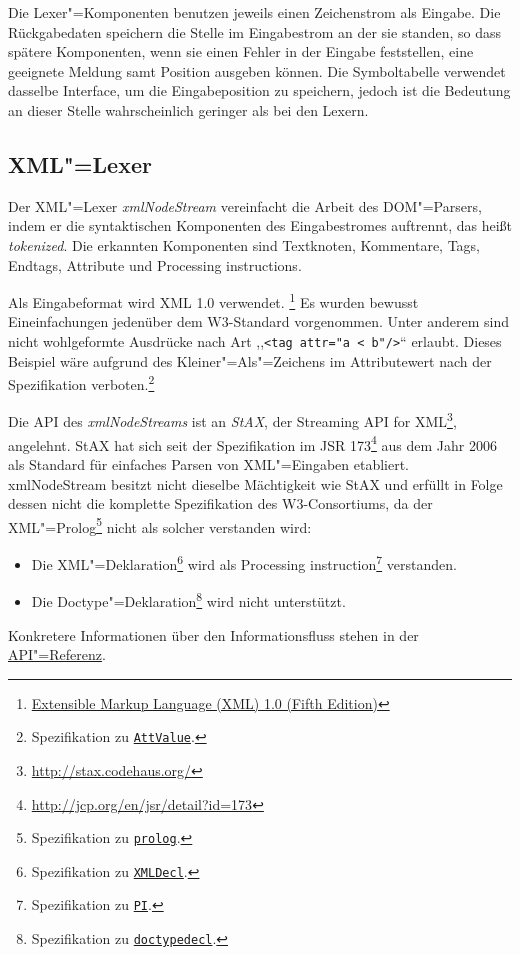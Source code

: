 \documentclass[10pt,a4paper,ngerman,titlepage,tocindentauto]{scrartcl}
\newcommand{\xmlNote}[2]{\footnote{Spezifikation zu \href{http://www.w3.org/TR/2008/REC-xml-20081126/\#{#1}}{\texttt{#2}}.}}
\newcommand{\link}[1]{\href{#1}{#1}}
\newcommand{\fnlink}[1]{\footnote{\link{#1}}}
\begin{document}
		Die Lexer"=Komponenten benutzen jeweils einen Zeichenstrom als Eingabe. Die Rückgabedaten speichern die
		Stelle im Eingabestrom an der sie standen, so dass spätere Komponenten, wenn sie einen Fehler
		in der Eingabe feststellen, eine geeignete Meldung samt Position ausgeben können.
		Die Symboltabelle verwendet dasselbe Interface, um die Eingabeposition zu speichern, jedoch ist
		die Bedeutung an dieser Stelle wahrscheinlich geringer als bei den Lexern.
		
		\subsection[XML"=Lexer]{\hypertarget{Teilprojekte_XML_Lexer}{XML"=Lexer}}
			Der XML"=Lexer {\em xmlNodeStream} vereinfacht die Arbeit des DOM"=Parsers, indem er die syntaktischen
			Komponenten des Eingabestromes auftrennt, das heißt {\em tokenized}.
			Die erkannten Komponenten sind Textknoten, Kommentare, Tags, Endtags, Attribute und Processing instructions.
			
			Als Eingabeformat wird XML 1.0 verwendet.%
			\footnote{\href{http://www.w3.org/TR/2008/REC-xml-20081126/}{Extensible Markup Language (XML) 1.0 (Fifth Edition)}}
			Es wurden bewusst Eineinfachungen jedenüber dem W3-Standard vorgenommen. Unter anderem sind
			nicht wohlgeformte Ausdrücke nach Art ,,\verb|<tag attr="a < b"/>|`` erlaubt.
			Dieses Beispiel wäre aufgrund des Kleiner"=Als"=Zeichens im Attributewert
			nach der Spezifikation verboten.\xmlNote{NT-AttValue}{AttValue}
			
			Die API des {\em xmlNodeStreams} ist an {\em StAX}, der Streaming API for XML\fnlink{http://stax.codehaus.org/},
			angelehnt. StAX hat sich seit der Spezifikation im JSR 173\fnlink{http://jcp.org/en/jsr/detail?id=173} aus
			dem Jahr 2006 als Standard für einfaches Parsen von XML"=Eingaben etabliert.
			xmlNodeStream besitzt nicht dieselbe Mächtigkeit wie StAX und erfüllt in Folge dessen
			nicht die komplette Spezifikation des W3-Consortiums, da der XML"=Prolog\xmlNote{xmldoc}{prolog}
			nicht als solcher verstanden wird:
			\begin{itemize}
				\item
					Die XML"=Deklaration\xmlNote{NT-XMLDecl}{XMLDecl} wird als
					Processing instruction\xmlNote{NT-PI}{PI} verstanden.
				\item
					Die Doctype"=Deklaration\xmlNote{NT-doctypedecl}{doctypedecl} wird nicht unterstützt.
			\end{itemize}
			Konkretere Informationen über den Informationsfluss stehen in der \hyperlink{XML-Lexer-API}{API"=Referenz}.
			
\end{document}
